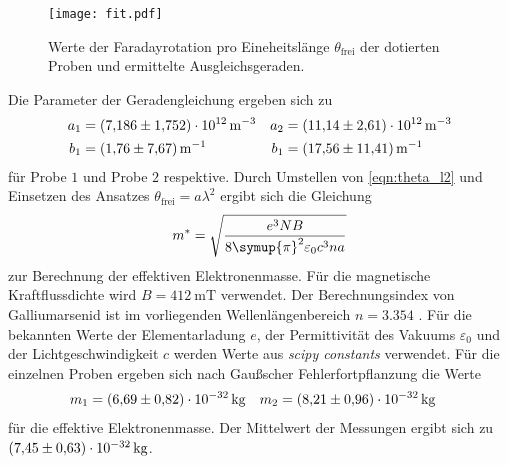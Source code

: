 \begin{figure}
  \centering
  \texttt{[image: fit.pdf]}
  \caption{Werte der Faradayrotation pro Eineheitslänge $\theta_\text{frei}$ der dotierten Proben und ermittelte Ausgleichsgeraden.}
  \label{fig:fit}
\end{figure}

Die Parameter der Geradengleichung ergeben sich zu
\begin{align*}
  a_1 &= \qty{7.186+-1.752e12}{\metre^{-3}} &  a_2 &= \qty{11.14+-2.61e12}{\metre^{-3}} \\
  b_1 &= \qty{1.76+-7.67}{\metre^{-1}} & b_1 &= \qty{17.56+-11.41}{\metre^{-1}}
\end{align*}
für Probe $1$ und Probe $2$ respektive. Durch Umstellen von \autoref{eqn:theta_l2} und Einsetzen des Ansatzes $\theta_\text{frei} = a \lambda^2$ ergibt sich 
die Gleichung
\begin{equation}
  m^* = \sqrt{\frac{e^3 N B}{8 \symup{\pi}^2 \varepsilon_0 c^3 n a}}
\end{equation}
zur Berechnung der effektiven Elektronenmasse. Für die magnetische Kraftflussdichte wird $B = \qty{412}{\milli\tesla}$ verwendet. Der Berechnungsindex von Galliumarsenid ist
im vorliegenden Wellenlängenbereich $n = \num{3.354}$ \cite{Brechungsindex_GaAs}. Für die bekannten Werte der Elementarladung $e$, der Permittivität des Vakuums $\varepsilon_0$ und der 
Lichtgeschwindigkeit $c$ werden Werte aus \textit{scipy constants} \cite{scipy} verwendet. Für die einzelnen Proben ergeben sich nach Gaußscher Fehlerfortpflanzung 
die Werte
\begin{align*}
  m_1 &= \qty{6.69+-0.82e-32}{\kilo\gram} & m_2 &=  \qty{8.21+-0.96e-32}{\kilo\gram}
\end{align*}
für die effektive Elektronenmasse. Der Mittelwert der Messungen ergibt sich zu $\qty{7.45+-0.63e-32}{\kilo\gram}$.
